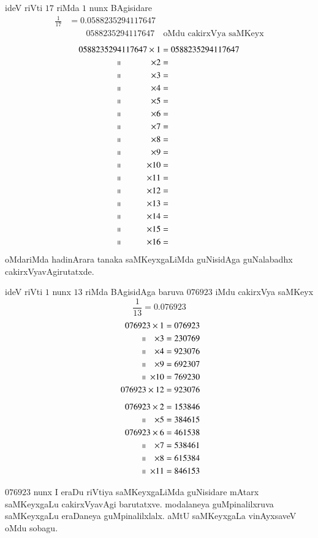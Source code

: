 ideV riVti $17$ riMda $1$ nunx BAgisidare
\begin{align*}
\frac{1}{17} &= 0.0588235294117647\\
&\qquad 0588235294117647 \quad\text{oMdu cakirxVya saMKeyx}
\end{align*}
\begin{align*}
0588235294117647 \times 1 &= 0588235294117647\\
~~~~~~\shortparallel ~~~~~~~~~~~~~ \times 2 &= \\
~~~~~~\shortparallel ~~~~~~~~~~~~~\times 3 &= \\
~~~~~~\shortparallel ~~~~~~~~~~~~~\times 4 &= \\
~~~~~~\shortparallel ~~~~~~~~~~~~~\times 5 &= \\
~~~~~~\shortparallel ~~~~~~~~~~~~~\times 6 &= \\
~~~~~~\shortparallel ~~~~~~~~~~~~~\times 7 &= \\
~~~~~~\shortparallel ~~~~~~~~~~~~~\times 8 &= \\
~~~~~~\shortparallel ~~~~~~~~~~~~~\times 9 &= \\
~~~~~~\shortparallel ~~~~~~~~~~~\times 10 &= \\
~~~~~~\shortparallel ~~~~~~~~~~~\times 11 &= \\
~~~~~~\shortparallel ~~~~~~~~~~~\times  12&= \\
~~~~~~\shortparallel ~~~~~~~~~~~\times  13&= \\
~~~~~~\shortparallel ~~~~~~~~~~~\times  14&= \\
~~~~~~\shortparallel ~~~~~~~~~~~\times  15&= \\
~~~~~~\shortparallel ~~~~~~~~~~~\times  16&= 
\end{align*}
oMdariMda hadinArara tanaka saMKeyxgaLiMda guNisidAga guNalabadhx cakirxVyavAgirutatxde.

ideV riVti $1$ nunx $13$ riMda BAgisidAga baruva $076923$ iMdu cakirxVya saMKeyx
$$
\frac{1}{13} = 0.076923
$$
\begin{align*}
076923 \times 1 &= 076923 \\
~~~~~~~~~\shortparallel ~~~\times 3 &= 230769 \\ 
~~~~~~~~~\shortparallel ~~~\times 4 &= 923076 \\
~~~~~~~~~\shortparallel ~~~\times 9 &= 692307 \\ 
~~~~~~~~~~~\shortparallel ~\times 10 &= 769230 \\
076923\times 12 &= 923076\\[5pt] 
076923 \times 2 &= 153846 \\
~~~~~~~~~\shortparallel ~~~\times 5 &= 384615 \\
076923   \times 6 &= 461538 \\
~~~~~~~~~\shortparallel ~~~\times 7 &= 538461 \\
~~~~~~~~~\shortparallel ~~~\times 8 &= 615384 \\
~~~~~~~~~~~\shortparallel ~\times 11 &= 846153 
\end{align*}

$076923$ nunx  I eraDu riVtiya saMKeyxgaLiMda guNisidare mAtarx saMKeyxgaLu cakirxVyavAgi barutatxve. modalaneya guMpinalilxruva saMKeyxgaLu eraDaneya guMpinalilxlalx. aMtU saMKeyxgaLa vinAyxsaveV oMdu sobagu.

